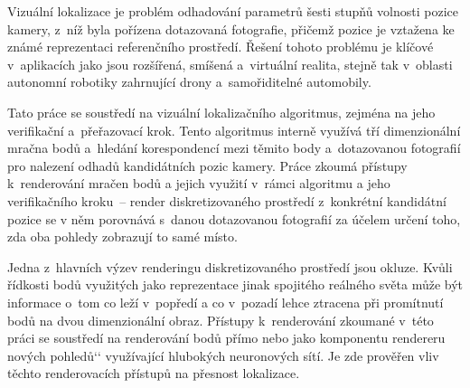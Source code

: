 \documentclass[12pt]{report}
\providecommand{\uv}[1]{\raisebox{-1.3ex}{’’}#1‘‘}
\begin{document}
Vizuální lokalizace je problém odhadování parametrů šesti stupňů volnosti
pozice kamery, z~níž byla pořízena dotazovaná fotografie, přičemž pozice
je vztažena ke známé reprezentaci referenčního prostředí. Řešení tohoto
problému je klíčové v~aplikacích jako jsou rozšířená, smíšená a~virtuální
realita, stejně tak v~oblasti autonomní robotiky zahrnující drony
a~samořiditelné automobily.

Tato práce se soustředí na vizuální lokalizačního algoritmus, zejména na
jeho verifikační a~přeřazovací krok. Tento algoritmus interně využívá
tří dimenzionální mračna bodů a~hledání korespondencí mezi těmito body
a~dotazovanou fotografií pro nalezení odhadů kandidátních pozic kamery.
Práce zkoumá přístupy k~renderování mračen bodů a jejich využití v~rámci
algoritmu a jeho verifikačního kroku~-- render diskretizovaného prostředí
z~konkrétní kandidátní pozice se v něm porovnává s~danou dotazovanou fotografií
za účelem určení toho, zda oba pohledy zobrazují to samé místo.

Jedna z~hlavních výzev renderingu diskretizovaného prostředí jsou okluze.
Kvůli řídkosti bodů využitých jako reprezentace jinak spojitého reálného
světa může být informace o~tom co leží v~popředí a co v~pozadí lehce
ztracena při promítnutí bodů na dvou dimenzionální obraz. Přístupy
k~renderování zkoumané v~této práci se soustředí na renderování bodů přímo
nebo jako komponentu rendereru \uv{nových pohledů} využívající hlubokých
neuronových sítí. Je zde prověřen vliv těchto renderovacích přístupů na
přesnost lokalizace.
\end{document}
